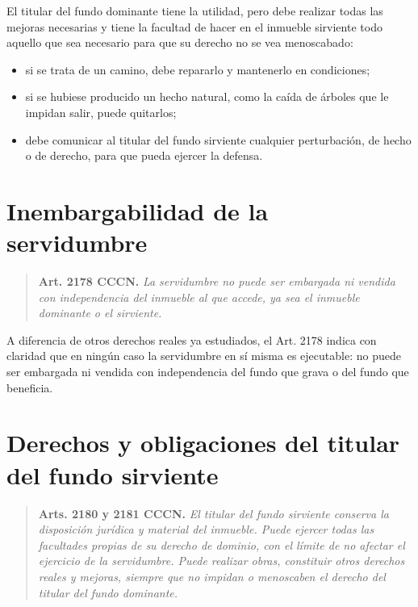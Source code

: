 \documentclass[12pt,oneside]{book}
\begin{document}
El titular del fundo dominante tiene la utilidad, pero debe realizar todas las mejoras necesarias y tiene la facultad de hacer en el inmueble sirviente todo aquello que sea necesario para que su derecho no se vea menoscabado:
\begin{itemize}
    \item si se trata de un camino, debe repararlo y mantenerlo en condiciones;
    \item si se hubiese producido un hecho natural, como la caída de árboles que le impidan salir, puede quitarlos;
    \item debe comunicar al titular del fundo sirviente cualquier perturbación, de hecho o de derecho, para que pueda ejercer la defensa.
\end{itemize}

\section{Inembargabilidad de la servidumbre}

\begin{quote}
\textbf{Art. 2178 CCCN.} \textit{La servidumbre no puede ser embargada ni vendida con independencia del inmueble al que accede, ya sea el inmueble dominante o el sirviente.}
\end{quote}

A diferencia de otros derechos reales ya estudiados, el Art. 2178 indica con claridad que en ningún caso la servidumbre en sí misma es ejecutable: no puede ser embargada ni vendida con independencia del fundo que grava o del fundo que beneficia.

\section{Derechos y obligaciones del titular del fundo sirviente}

\begin{quote}
\textbf{Arts. 2180 y 2181 CCCN.} \textit{El titular del fundo sirviente conserva la disposición jurídica y material del inmueble. Puede ejercer todas las facultades propias de su derecho de dominio, con el límite de no afectar el ejercicio de la servidumbre. Puede realizar obras, constituir otros derechos reales y mejoras, siempre que no impidan o menoscaben el derecho del titular del fundo dominante.}
\end{quote}
\end{document}
